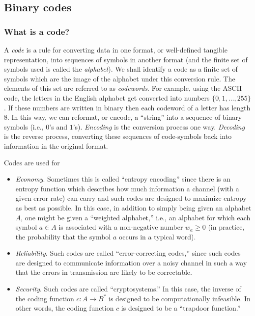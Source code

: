 \subsection{Binary codes}


\subsubsection{What is a code?}

A {\it code} is a rule for converting data in one
format, or well-defined tangible representation,
into sequences of symbols in another format (and the finite set of symbols
used is called the {\it alphabet}). We shall identify a code
as a finite set of symbols which are the image
of the alphabet under this conversion rule. The elements of this set
are referred to as {\it codewords}. For example, using the ASCII code,
the letters in the English alphabet get converted into numbers
$\{0, 1, \dots, 255\}$. If these numbers are written in binary
then each codeword of a letter has length 8. In this way, we can
reformat, or encode, a ``string'' into a sequence of binary symbols (i.e.,
$0$'s and $1$'s).
{\it Encoding} is the conversion process one way.
{\it Decoding} is the reverse
process, converting these sequences of code-symbols back into information
in the original format.


Codes are used for

\begin{itemize}
\item
{\it Economy}. Sometimes this is called ``entropy encoding''
since there is an entropy function which describes how much information
a channel (with a given error rate) can carry and such
codes are designed to maximize entropy as best as possible.
In this case, in addition to simply being given an alphabet $A$, one
might be given a ``weighted alphabet,'' i.e., an alphabet for which each
symbol $a\in A$ is associated with a non-negative number
$w_a\geq 0$ (in practice, the probability that the
symbol $a$ occurs in a typical word).

\item
{\it Reliability}. Such codes are called ``error-correcting codes,''
since such codes are designed to communicate information
over a noisy channel in such a way that the errors in transmission are
likely to be correctable.

\item
{\it Security}. Such codes are called ``cryptosystems.''
In this case, the inverse of the coding function $c:A\to B^*$ is designed to be
computationally infeasible. In other words, the coding function
$c$ is designed to be a ``trapdoor function.''

\end{itemize}

